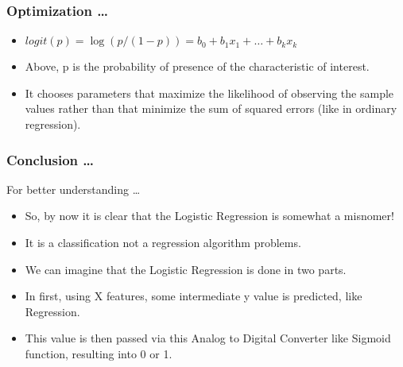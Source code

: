 \begin{frame}[fragile]\frametitle{Optimization \ldots}
 \begin{itemize}
\item $logit(p) = \log(p/(1-p)) = b_0 + b_1 x_1 +  \ldots + b_k x_k$

\item Above, p is the probability of presence of the characteristic of interest. 
\item It chooses parameters that maximize  the  likelihood  of  observing  the  sample  values  rather  than  that  minimize  the  sum  of squared errors (like in ordinary regression).
\end{itemize}

\end{frame}

\begin{frame}[fragile]\frametitle{Conclusion \ldots}
For better understanding \ldots
 \begin{itemize}
 \item So, by now it is clear that the Logistic Regression is somewhat a misnomer!  
\item It  is  a  classification  not  a  regression  algorithm problems.
\item We can imagine that the Logistic Regression is done in two parts.
\item In first, using X features, some intermediate y value is predicted, like Regression.
\item This value is then passed via this Analog to Digital Converter like Sigmoid function, resulting into 0 or 1.
\end{itemize}
\end{frame}




